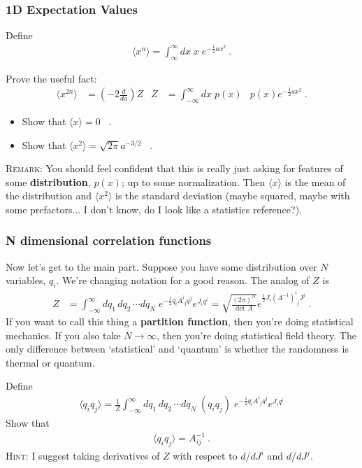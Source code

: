 \documentclass[12pt]{article}
\begin{document}
\subsubsection{1D Expectation Values}

Define
\begin{align}
	\langle x^n \rangle = \int_{\infty}^\infty dx \; x \; e^{-\frac 12 ax^2} \ .
\end{align}

Prove the useful fact:
\begin{align}
	\langle x^{2n} \rangle &= \left(-2\frac{d}{da}\right) Z
	& 
	Z &= \int_{-\infty}^\infty dx\; p(x) 
	&
	p(x)  e^{-\frac 12 ax^2}\ .
\end{align}


\begin{itemize}
	\item Show that $\langle x\rangle = 0$ \ .
	\item Show that $\langle x^2\rangle = \sqrt{2\pi} a^{-3/2}$ \ .
\end{itemize}

\textsc{Remark}: You should feel confident that this is really just asking for features of some \textbf{distribution}, $p(x)$; up to some normalization. Then $\langle x \rangle$ is the mean of the distribution and $\langle x^2 \rangle$ is the standard deviation (maybe squared, maybe with some prefactors... I don't know, do I look like a statistics reference?).  

\subsubsection{N dimensional correlation functions}

Now let's get to the main part. Suppose you have some distribution over $N$ variables, $q_i$. We're changing notation for a good reason. The analog of $Z$ is
\begin{align}
	Z & = \int_{-\infty}^\infty dq_1\, dq_2\, \cdots dq_N \;
	e^{-\frac 12 q_i A^i_{\phantom{i}j} q^j}
	e^{J_i q^i}
	= 
	\sqrt{\frac{(2\pi)^N}{\text{det }A}} e^{\frac 12 J_i (A^{-1})^i_{\phantom{i}j} J^j} \ .
\end{align}
If you want to call this thing a \textbf{partition function}, then you're doing statistical mechanics. If you also take $N\to \infty$, then you're doing statistical field theory. The only difference between `statistical' and `quantum' is whether the randomness is thermal or quantum.

Define
\begin{align}
	\langle q_i q_j \rangle = \frac{1}{Z}  
	\int_{-\infty}^\infty dq_1\, dq_2\, \cdots dq_N \;
	\left(q_i q_j\right)
	\;
	e^{-\frac 12 q_i A^i_{\phantom{i}j} q^j}
	e^{J_i q^i}
\end{align}
Show that
\begin{align}
	\langle q_i q_j \rangle = A^{-1}_{ij} \ .
\end{align}
\textsc{Hint}: I suggest taking derivatives of $Z$ with respect to $d/dJ^i$ and $d/dJ^j$. 
\end{document}
